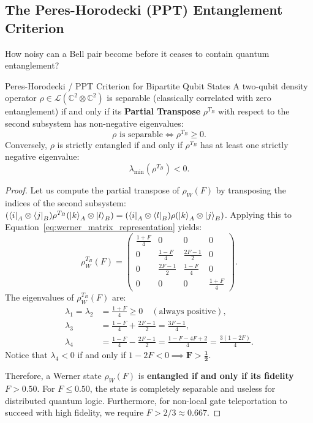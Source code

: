 \subsection{The Peres-Horodecki (PPT) Entanglement Criterion}
How noisy can a Bell pair become before it ceases to contain quantum entanglement?

\begin{theorembox}{Peres-Horodecki / PPT Criterion for Bipartite Qubit States}
A two-qubit density operator $\rho \in \mathcal{L}(\mathbb{C}^2 \otimes \mathbb{C}^2)$ is separable (classically correlated with zero entanglement) if and only if its \textbf{Partial Transpose} $\rho^{T_B}$ with respect to the second subsystem has non-negative eigenvalues:
\begin{equation}
    \rho \text{ is separable} \iff \rho^{T_B} \ge 0.
    \label{eq:ppt_criterion_ch3}
\end{equation}
Conversely, $\rho$ is strictly entangled if and only if $\rho^{T_B}$ has at least one strictly negative eigenvalue:
\begin{equation}
    \lambda_{\min}\left( \rho^{T_B} \right) < 0.
\end{equation}
\end{theorembox}

\begin{proof}
Let us compute the partial transpose of $\rho_W(F)$ by transposing the indices of the second subsystem: $(\bra{i}_A \otimes \bra{j}_B) \rho^{T_B} (\ket{k}_A \otimes \ket{l}_B) = (\bra{i}_A \otimes \bra{l}_B) \rho (\ket{k}_A \otimes \ket{j}_B)$. Applying this to Equation~\ref{eq:werner_matrix_representation} yields:
\begin{equation}
    \rho_W^{T_B}(F) = \begin{pmatrix}
        \frac{1+F}{4} & 0 & 0 & 0 \\
        0 & \frac{1-F}{4} & \frac{2F-1}{2} & 0 \\
        0 & \frac{2F-1}{2} & \frac{1-F}{4} & 0 \\
        0 & 0 & 0 & \frac{1+F}{4}
    \end{pmatrix}.
\end{equation}
The eigenvalues of $\rho_W^{T_B}(F)$ are:
\begin{align}
    \lambda_1 = \lambda_2 &= \frac{1+F}{4} \ge 0 \quad (\text{always positive}), \\
    \lambda_3 &= \frac{1-F}{4} + \frac{2F-1}{2} = \frac{3F - 1}{4}, \\
    \lambda_4 &= \frac{1-F}{4} - \frac{2F-1}{2} = \frac{1 - F - 4F + 2}{4} = \frac{3(1 - 2F)}{4}.
\end{align}
Notice that $\lambda_4 < 0$ if and only if $1 - 2F < 0 \implies \mathbf{F > \frac{1}{2}}$. 

Therefore, a Werner state $\rho_W(F)$ is \textbf{entangled if and only if its fidelity $F > 0.50$}. For $F \le 0.50$, the state is completely separable and useless for distributed quantum logic. Furthermore, for non-local gate teleportation to succeed with high fidelity, we require $F > 2/3 \approx 0.667$.
\end{proof}

